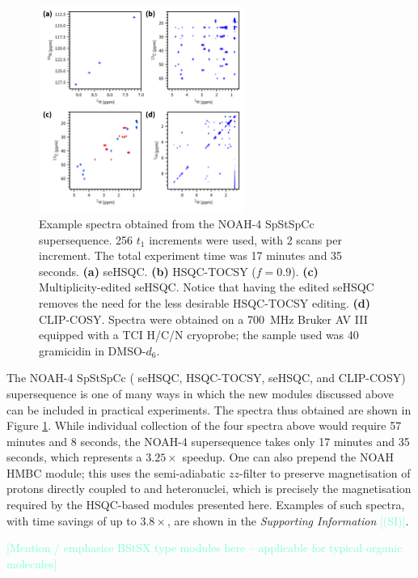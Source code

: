 \documentclass[draft,11pt]{article}
\newcommand*{\carbon}{\ce{^{13}C}}
\newcommand*{\nitrogen}{\ce{^{15}N}}
\newcommand*{\hl}[1]{\textcolor{Aquamarine}{[#1]}}
\newcommand*{\figref}[1]{Figure \ref{fig:#1}}
\newcommand*{\SInf}{\textit{Supporting Information}}
\newcommand*{\sitodo}{\hl{(SI)}}
\newcommand*{\grami}{Spectra were obtained on a \SI{700}{\MHz} Bruker AV III equipped with a TCI H/C/N cryoprobe; the sample used was \SI{40}{\milli\molar} gramicidin in DMSO-$d_6$.}
\begin{document}
\begin{figure}
    \centering
    \includegraphics[width=0.6\textwidth]{spstspcc.png}
    \caption{
        Example spectra obtained from the NOAH-4 SpStSpCc supersequence.
        256 $t_1$ increments were used, with 2 scans per increment.
        The total experiment time was 17 minutes and 35 seconds.
        \textbf{(a)} \nitrogen{} seHSQC.
        \textbf{(b)} \carbon{} HSQC-TOCSY ($f = 0.9$).
        \textbf{(c)} Multiplicity-edited \carbon{} seHSQC. Notice that having the edited seHSQC removes the need for the less desirable HSQC-TOCSY editing.
        \textbf{(d)} CLIP-COSY.
        \grami{}
    }
    \label{fig:example_spec}
\end{figure}

The NOAH-4 SpStSpCc (\nitrogen{} seHSQC, \carbon{} HSQC-TOCSY, \carbon{} seHSQC, and CLIP-COSY) supersequence is one of many ways in which the new modules discussed above can be included in practical experiments.
The spectra thus obtained are shown in \figref{example_spec}.
While individual collection of the four spectra above would require 57 minutes and 8 seconds, the NOAH-4 supersequence takes only 17 minutes and 35 seconds, which represents a $3.25\times$ speedup.
One can also prepend the NOAH HMBC module;\autocite{Kupce2019JMR} this uses the semi-adiabatic $zz$-filter to preserve magnetisation of protons directly coupled to \carbon{} and \nitrogen{} heteronuclei, which is precisely the magnetisation required by the HSQC-based modules presented here.
Examples of such spectra, with time savings of up to $3.8\times$, are shown in the \SInf{} \sitodo{}.

\hl{Mention / emphasise BStSX type modules here -- applicable for typical organic molecules}
\end{document}
